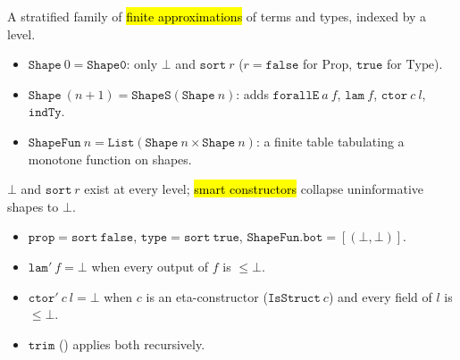 \begin{definition}
\label{def:expa-shape}
\leanok
{}

 A stratified family of \hl{finite approximations} of terms and types, indexed by a
level.
\begin{itemize}
\item $\mathtt{Shape}\ 0 = \mathtt{Shape0}$: only $\bot$ and $\mathtt{sort}\ r$ ($r=\mathtt{false}$
for $\mathrm{Prop}$, $\mathtt{true}$ for $\mathrm{Type}$).
\item $\mathtt{Shape}\ (n{+}1) = \mathtt{ShapeS}(\mathtt{Shape}\ n)$: adds $\mathtt{forallE}\ a\ f$,
$\mathtt{lam}\ f$, $\mathtt{ctor}\ c\ l$, $\mathtt{indTy}$.
\item $\mathtt{ShapeFun}\ n = \mathtt{List}(\mathtt{Shape}\ n\times\mathtt{Shape}\ n)$: a finite table
tabulating a monotone function on shapes.
\end{itemize}
\end{definition}

\begin{definition}
\label{def:expa-shape-ctors}
\leanok
{}
 $\bot$ and $\mathtt{sort}\ r$ exist at every level; \hl{smart constructors} collapse
uninformative shapes to $\bot$.
\begin{itemize}
\item $\mathtt{prop} = \mathtt{sort}\ \mathtt{false}$, $\mathtt{type} = \mathtt{sort}\ \mathtt{true}$,
$\mathtt{ShapeFun.bot} = [(\bot,\bot)]$.
\item $\mathtt{lam}'\ f = \bot$ when every output of $f$ is $\le\bot$.
\item $\mathtt{ctor}'\ c\ l = \bot$ when $c$ is an eta-constructor ($\mathtt{IsStruct}\ c$) and every
field of $l$ is $\le\bot$.
\item $\mathtt{trim}$ () applies both
recursively.
\end{itemize}
\end{definition}

